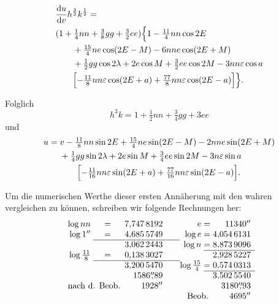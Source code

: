 \[
\begin{aligned}
 &\frac{\mathrm{d}u}{\mathrm{d}v}h^{\frac32}k^{\frac12}=\\
 &(1+\tfrac14nn+\tfrac38gg+\tfrac32ee)
       \Bigl\{1-\tfrac{11}{4}nn\cos2E\\
 &\qquad+\tfrac{15}{4}ne\cos(2E-M)-6nne\cos(2E+M)\\
 &\qquad+\tfrac12gg\cos2\lambda+2e\cos M
                         +\tfrac32ee\cos2M-3nn\varepsilon\cos a\\
 &\qquad\Bigl[-\tfrac{11}{8}nn\varepsilon\cos(2E+a)
                         +\tfrac{77}{8}nn\varepsilon\cos(2E-a)\Bigr]\Bigr\}.
\end{aligned}
\]
\par\noindent\hspace*{\parindent}Folglich
\[
 h^3k=1+\tfrac12nn+\tfrac34gg+3ee
\]
\noindent und
\[
\begin{aligned}
 u={}&v-\tfrac{11}{8}nn\sin2E+\tfrac{15}{4}ne\sin(2E-M)-2nne\sin(2E+M)\\
 &+\tfrac14gg\sin2\lambda+2e\sin M+\tfrac34ee\sin2M-3n\varepsilon\sin a\\
 &\qquad\Bigl[-\tfrac{11}{16}nn\varepsilon\sin(2E+a)
                    +\tfrac{77}{16}nn\varepsilon\sin(2E-a)\Bigr].
\end{aligned}
\]
\par\noindent\hspace*{\parindent}Um die numerischen Werthe dieser ersten
Annäherung mit den wahren vergleichen zu können, schreiben wir folgende
Rechnungen her:
\[
\begin{array}{r@{\;}c@{\;}r@{\qquad}r@{\;}c@{\;}r}
 \log nn&=&7{,}747\,8192 &e&=&11340^{\prime\prime}\\
 \log1^{\prime\prime}&=&4{,}685\,5749 &\log e&=&4{,}054\,6131\\ \cline{2-3}
 &&3{,}062\,2443 &\log n&=&8{,}873\,9096\\ \cline{5-6}
 \log\frac{11}{8}&=&0{,}138\,3027 &&&2{,}928\,5227\\ \cline{2-3}
 &&3{,}200\,5470 &\log\frac{15}{4}&=&0{,}574\,0313\\ \cline{5-6}
 &&1586\overset{\prime\prime}{,}89 &&&3{,}502\,5540\\
 \multicolumn{2}{r}{\text{nach d. Beob.}}&1928^{\prime\prime}
                  &&&3180\overset{\prime\prime}{,}93\\
 &&&\multicolumn{2}{r}{\text{Beob.}}&4695^{\prime\prime}
\end{array}
\]
